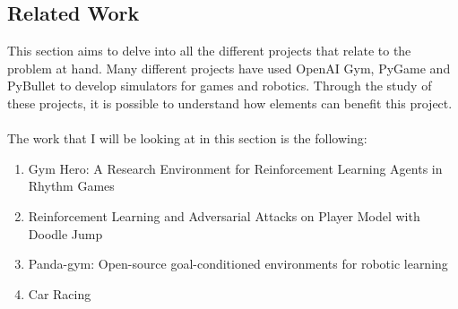 \documentclass[a4paper,12pt]{article}
\begin{document}
\subsection{Related Work}
This section aims to delve into all the different projects that relate to the problem at hand. Many different projects have used OpenAI Gym, PyGame and PyBullet to develop simulators for games and robotics. Through the study of these projects, it is possible to understand how elements can benefit this project.
\\\\
The work that I will be looking at in this section is the following: 
\begin{enumerate}
  \item Gym Hero: A Research Environment for Reinforcement Learning Agents in Rhythm Games 

  \item Reinforcement Learning and Adversarial Attacks on Player Model with Doodle Jump
  \item Panda-gym: Open-source goal-conditioned environments for robotic learning

  \item Car Racing

\end{enumerate}
\end{document}
